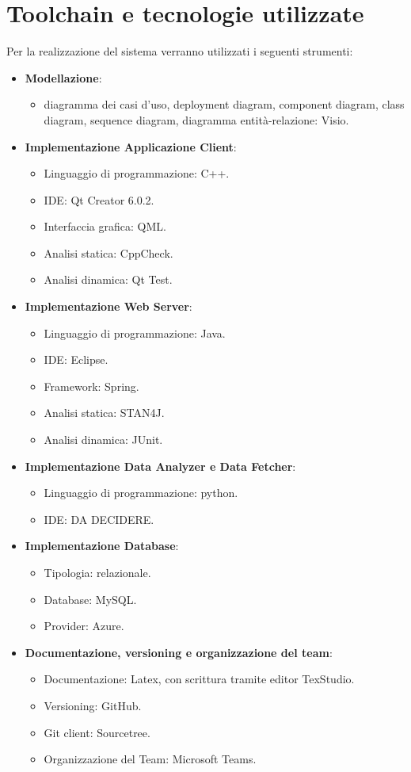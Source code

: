 \section{Toolchain e tecnologie utilizzate}
Per la realizzazione del sistema verranno utilizzati i seguenti strumenti:
\begin{itemize}
	\item \textbf{Modellazione}:
	\begin{itemize}
		\item diagramma dei casi d'uso, deployment diagram, component diagram, class
		diagram, sequence diagram, diagramma entità-relazione: Visio.
	\end{itemize}
	\item \textbf{Implementazione Applicazione Client}:
	\begin{itemize}
		\item Linguaggio di programmazione: C++.
		\item IDE: Qt Creator 6.0.2.
		\item Interfaccia grafica: QML.
		\item Analisi statica: CppCheck.
		\item Analisi dinamica: Qt Test.
	\end{itemize}
	\item \textbf{Implementazione Web Server}:
	\begin{itemize}
		\item Linguaggio di programmazione: Java.
		\item IDE: Eclipse.
		\item Framework: Spring.
		\item Analisi statica: STAN4J.
		\item Analisi dinamica: JUnit.
	\end{itemize}
	\item \textbf{Implementazione Data Analyzer e Data Fetcher}:
	\begin{itemize}
		\item Linguaggio di programmazione: python.
		\item IDE: DA DECIDERE.
	\end{itemize}
	\item \textbf{Implementazione Database}:
	\begin{itemize}
		\item Tipologia: relazionale.
		\item Database: MySQL.
		\item Provider: Azure.
	\end{itemize}
	\item \textbf{Documentazione, versioning e organizzazione del team}:
	\begin{itemize}
		\item Documentazione: Latex, con scrittura tramite editor TexStudio.
		\item Versioning: GitHub.
		\item Git client: Sourcetree.
		\item Organizzazione del Team: Microsoft Teams.
	\end{itemize}
\end{itemize}
